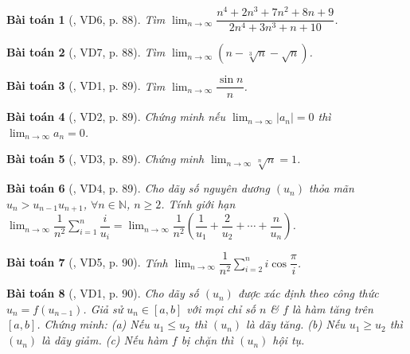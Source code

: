 \documentclass{article}
\newtheorem{baitoan}{Bài toán}
\begin{document}
\begin{baitoan}[\cite{Hung_nang_cao_phat_trien_Toan_11_tap_1}, VD6, p. 88]
	Tìm $\lim_{n\to\infty} \dfrac{n^4 + 2n^3 + 7n^2 + 8n + 9}{2n^4 + 3n^3 + n + 10}$.
\end{baitoan}

\begin{baitoan}[\cite{Hung_nang_cao_phat_trien_Toan_11_tap_1}, VD7, p. 88]
	Tìm $\lim_{n\to\infty} (n - \sqrt[3]{n} - \sqrt{n})$.
\end{baitoan}

\begin{baitoan}[\cite{Hung_nang_cao_phat_trien_Toan_11_tap_1}, VD1, p. 89]
	Tìm $\lim_{n\to\infty} \dfrac{\sin n}{n}$.
\end{baitoan}

\begin{baitoan}[\cite{Hung_nang_cao_phat_trien_Toan_11_tap_1}, VD2, p. 89]
	Chứng minh nếu $\lim_{n\to\infty} |a_n| = 0$ thì $\lim_{n\to\infty} a_n = 0$.
\end{baitoan}

\begin{baitoan}[\cite{Hung_nang_cao_phat_trien_Toan_11_tap_1}, VD3, p. 89]
	Chứng minh $\lim_{n\to\infty} \sqrt[n]{n} = 1$.
\end{baitoan}

\begin{baitoan}[\cite{Hung_nang_cao_phat_trien_Toan_11_tap_1}, VD4, p. 89]
	Cho dãy số nguyên dương $(u_n)$ thỏa mãn $u_n > u_{n-1}u_{n+1}$, $\forall n\in\mathbb{N}$, $n\ge2$. Tính giới hạn $\lim_{n\to\infty} \dfrac{1}{n^2}\sum_{i=1}^n \dfrac{i}{u_i} = \lim_{n\to\infty} \dfrac{1}{n^2}\left(\dfrac{1}{u_1} + \dfrac{2}{u_2} + \cdots + \dfrac{n}{u_n}\right)$.
\end{baitoan}

\begin{baitoan}[\cite{Hung_nang_cao_phat_trien_Toan_11_tap_1}, VD5, p. 90]
	Tính $\lim_{n\to\infty} \dfrac{1}{n^2}\sum_{i=2}^n i\cos\dfrac{\pi}{i}$.
\end{baitoan}

\begin{baitoan}[\cite{Hung_nang_cao_phat_trien_Toan_11_tap_1}, VD1, p. 90]
	Cho dãy số $(u_n)$ được xác định theo công thức $u_n = f(u_{n-1})$. Giả sử $u_n\in[a,b]$ với mọi chỉ số $n$ \& $f$ là hàm tăng trên $[a,b]$. Chứng minh: (a) Nếu $u_1\le u_2$ thì $(u_n)$ là dãy tăng. (b) Nếu $u_1\ge u_2$ thì $(u_n)$ là dãy giảm. (c) Nếu hàm $f$ bị chặn thì $(u_n)$ hội tụ.
\end{baitoan}
\end{document}
